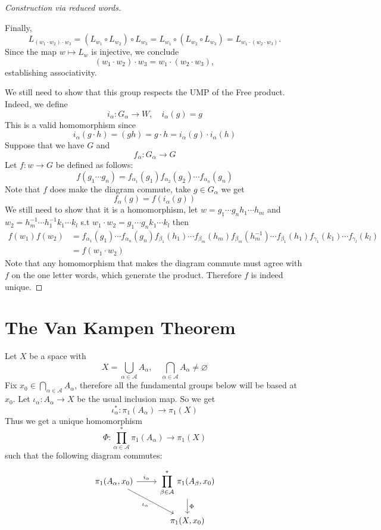\documentclass[11pt,a4paper]{article}
\theoremstyle{definition}
\theoremstyle{plain}
\theoremstyle{remark}
\newcommand{\1}{\mathbbm{1}}
\begin{document}
\begin{proof}[Construction via reduced words]
\begin{itemize}
    Finally,
    \[
    L_{(w_1 \cdot w_2)\cdot w_3}
    = (L_{w_1}\circ L_{w_2})\circ L_{w_3}
    = L_{w_1}\circ (L_{w_2}\circ L_{w_3})
    = L_{w_1 \cdot (w_2 \cdot w_3)}.
    \]
    Since the map $w \mapsto L_w$ is injective, we conclude
    \[
    (w_1 \cdot w_2)\cdot w_3
    = w_1 \cdot (w_2 \cdot w_3),
    \]
    establishing associativity.
\end{itemize}

We still need to show that this group respects the UMP of the Free product. Indeed, we define 
$$i_\alpha \colon G_\alpha \to W, \quad i_\alpha(g) = g$$
This is a valid homomorphism since 
$$i_\alpha (g \cdot h) = (gh) = g \cdot h = i_{\alpha} (g) \cdot i_\alpha (h)$$
Suppose that we have $G$ and 
$$f_\alpha \colon G_\alpha \to G$$
Let $f \colon w \to G$ be defined as follows: 
$$f(g_1 \cdots g_n) = f_{\alpha_1}(g_1) f_{\alpha_2}(g_2) \cdots f_{\alpha_n} (g_n)$$
Note that $f$ does make the diagram commute, take $g \in G_\alpha$ we get
$$f_\alpha(g) = f(i_\alpha(g))$$
We still need to show that it is a homomorphism, let $w = g_1 \cdots g_n h_1 \cdots h_m$ and $w_2 = h_m^{-1} \cdots h_1^{-1} k_1 \cdots k_l$
s.t $w_1 \cdot w_2 = g_1 \cdots g_n k_1 \cdots k_l$  then 
\begin{align*}
    f(w_1) f(w_2) &= f_{\alpha_1} (g_1) \cdots f_{\alpha_n} (g_n) f_{\beta_1}(h_1) \cdots f_{\beta_m} (h_m) f_{\beta_m} (h_m^{-1}) \cdots f_{\beta_1}(h_1) f_{\gamma_1} (k_1) \cdots f_{\gamma_l} (k_l) \\
    &= f(w_1 \cdot w_2)
\end{align*} 
Note that any homomorphism that makes the diagram commute must agree with $f$ on the one letter words, which generate the product. Therefore $f$ is indeed unique. 
\end{proof}

\section{The Van Kampen Theorem}
Let $X$ be a space with 
$$X = \bigcup_{\alpha \in \mathcal{A}} A_\alpha, \quad \bigcap_{\alpha \in \mathcal{A}} A_\alpha \ne \varnothing$$
Fix $x_0 \in \bigcap_{\alpha \in \mathcal{A}} A_\alpha$, therefore all the fundamental groups below will be based at $x_0$. Let $\iota_\alpha \colon A_\alpha \to X$ 
be the usual inclusion map. So we get 
$$\iota_\alpha^* \colon \pi_1 (A_\alpha) \to \pi_1(X)$$
Thus we get a unique homomorphism 
$$\Phi \colon \prod_{\alpha \in \mathcal{A}}^* \pi_1(A_\alpha) \to \pi_1(X)$$
such that the following diagram commutes: 
\[
\begin{tikzcd}
\pi_1(A_\alpha,x_0) \arrow[r,"i_\alpha"] \arrow[dr,swap,"\iota_{\alpha}"] &
{\displaystyle \prod^\ast_{\beta\in\mathcal A}\,\pi_1(A_\beta,x_0)} \arrow[d,"\Phi"] \\
& \pi_1(X,x_0)
\end{tikzcd}
\]
\end{document}
